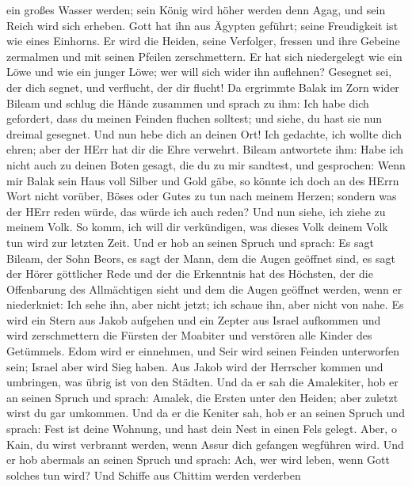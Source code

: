ein großes Wasser werden; sein König wird höher werden denn Agag, und
sein Reich wird sich erheben.  Gott hat ihn aus Ägypten
geführt; seine Freudigkeit ist wie eines Einhorns. Er wird die Heiden,
seine Verfolger, fressen und ihre Gebeine zermalmen und mit seinen
Pfeilen zerschmettern.  Er hat sich niedergelegt wie ein
Löwe und wie ein junger Löwe; wer will sich wider ihn auflehnen?
Gesegnet sei, der dich segnet, und verflucht, der dir flucht!
 Da ergrimmte Balak im Zorn wider Bileam und schlug die
Hände zusammen und sprach zu ihm: Ich habe dich gefordert, dass du
meinen Feinden fluchen solltest; und siehe, du hast sie nun dreimal
gesegnet.  Und nun hebe dich an deinen Ort! Ich gedachte,
ich wollte dich ehren; aber der HErr hat dir die Ehre verwehrt.
 Bileam antwortete ihm: Habe ich nicht auch zu deinen Boten
gesagt, die du zu mir sandtest, und gesprochen:  Wenn mir
Balak sein Haus voll Silber und Gold gäbe, so könnte ich doch an des
HErrn Wort nicht vorüber, Böses oder Gutes zu tun nach meinem Herzen;
sondern was der HErr reden würde, das würde ich auch reden?
 Und nun siehe, ich ziehe zu meinem Volk. So komm, ich will
dir verkündigen, was dieses Volk deinem Volk tun wird zur letzten Zeit.
 Und er hob an seinen Spruch und sprach: Es sagt Bileam,
der Sohn Beors, es sagt der Mann, dem die Augen geöffnet sind,
 es sagt der Hörer göttlicher Rede und der die Erkenntnis
hat des Höchsten, der die Offenbarung des Allmächtigen sieht und dem die
Augen geöffnet werden, wenn er niederkniet:  Ich sehe ihn,
aber nicht jetzt; ich schaue ihn, aber nicht von nahe. Es wird ein Stern
aus Jakob aufgehen und ein Zepter aus Israel aufkommen und wird
zerschmettern die Fürsten der Moabiter und verstören alle Kinder des
Getümmels.  Edom wird er einnehmen, und Seir wird seinen
Feinden unterworfen sein; Israel aber wird Sieg haben.  Aus
Jakob wird der Herrscher kommen und umbringen, was übrig ist von den
Städten.  Und da er sah die Amalekiter, hob er an seinen
Spruch und sprach: Amalek, die Ersten unter den Heiden; aber zuletzt
wirst du gar umkommen.  Und da er die Keniter sah, hob er
an seinen Spruch und sprach: Fest ist deine Wohnung, und hast dein Nest
in einen Fels gelegt.  Aber, o Kain, du wirst verbrannt
werden, wenn Assur dich gefangen wegführen wird.  Und er
hob abermals an seinen Spruch und sprach: Ach, wer wird leben, wenn Gott
solches tun wird?  Und Schiffe aus Chittim werden verderben
